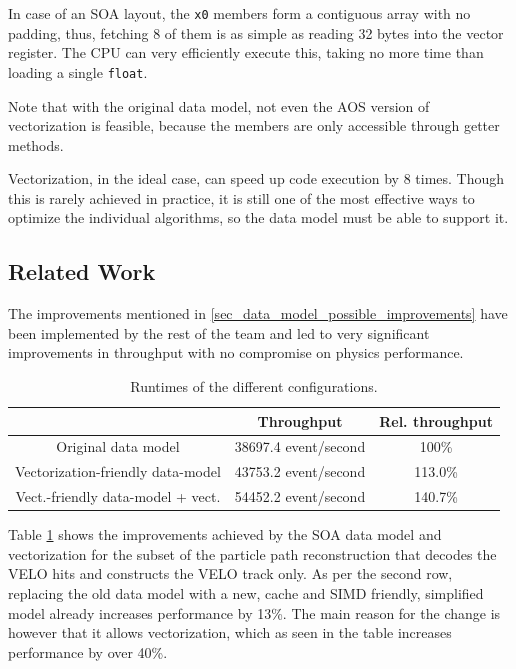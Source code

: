 \documentclass[12pt]{article}
\newcommand{\code}[1]{\texttt{#1}}
\begin{document}
In case of an SOA layout, the \code{x0} members form a contiguous array with no padding, thus, fetching 8 of them is as simple as reading 32 bytes into the vector register. The CPU can very efficiently execute this, taking no more time than loading a single \code{float}.

Note that with the original data model, not even the AOS version of vectorization is feasible, because the members are only accessible through getter methods.

Vectorization, in the ideal case, can speed up code execution by 8 times. Though this is rarely achieved in practice, it is still one of the most effective ways to optimize the individual algorithms, so the data model must be able to support it.


\subsection{Related Work}

The improvements mentioned in \ref{sec_data_model_possible_improvements} have been implemented by the rest of the team and led to very significant improvements in throughput with no compromise on physics performance.

\begin{table}[H]
	\centering
	\begin{tabular}{c | c | c}
		& Throughput & Rel. throughput \\
		\hline
		Original data model & 38697.4 event/second & 100\% \\
		\hline
		Vectorization-friendly data-model & 43753.2 event/second & 113.0\% \\
		\hline
		Vect.-friendly data-model + vect. & 54452.2 event/second & 140.7\%
	\end{tabular}
	\caption{Runtimes of the different configurations.}
	\label{tbl_datamodel_speedup_simd}
\end{table}

Table \ref{tbl_datamodel_speedup_simd} shows the improvements achieved by the SOA data model and vectorization for the subset of the particle path reconstruction that decodes the VELO hits and constructs the VELO track only. As per the second row, replacing the old data model with a new, cache and SIMD friendly, simplified model already increases performance by 13\%. The main reason for the change is however that it allows vectorization, which as seen in the table increases performance by over 40\%. 
\vspace{1pc}
\end{document}
